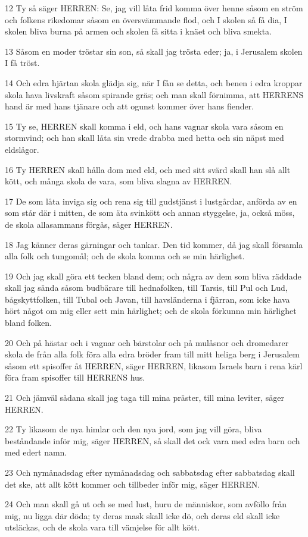 \par 12 Ty så säger HERREN: Se, jag vill låta frid komma över henne såsom en ström och folkens rikedomar såsom en översvämmande flod, och I skolen så få dia, I skolen bliva burna på armen och skolen få sitta i knäet och bliva smekta.
\par 13 Såsom en moder tröstar sin son, så skall jag trösta eder; ja, i Jerusalem skolen I få tröst.
\par 14 Och edra hjärtan skola glädja sig, när I fån se detta, och benen i edra kroppar skola hava livskraft såsom spirande gräs; och man skall förnimma, att HERRENS hand är med hans tjänare och att ogunst kommer över hans fiender.
\par 15 Ty se, HERREN skall komma i eld, och hans vagnar skola vara såsom en stormvind; och han skall låta sin vrede drabba med hetta och sin näpst med eldslågor.
\par 16 Ty HERREN skall hålla dom med eld, och med sitt svärd skall han slå allt kött, och många skola de vara, som bliva slagna av HERREN.
\par 17 De som låta inviga sig och rena sig till gudstjänst i lustgårdar, anförda av en som står där i mitten, de som äta svinkött och annan styggelse, ja, också möss, de skola allasammans förgås, säger HERREN.
\par 18 Jag känner deras gärningar och tankar. Den tid kommer, då jag skall församla alla folk och tungomål; och de skola komma och se min härlighet.
\par 19 Och jag skall göra ett tecken bland dem; och några av dem som bliva räddade skall jag sända såsom budbärare till hednafolken, till Tarsis, till Pul och Lud, bågskyttfolken, till Tubal och Javan, till havsländerna i fjärran, som icke hava hört något om mig eller sett min härlighet; och de skola förkunna min härlighet bland folken.
\par 20 Och på hästar och i vagnar och bärstolar och på mulåsnor och dromedarer skola de från alla folk föra alla edra bröder fram till mitt heliga berg i Jerusalem såsom ett spisoffer åt HERREN, säger HERREN, likasom Israels barn i rena kärl föra fram spisoffer till HERRENS hus.
\par 21 Och jämväl sådana skall jag taga till mina präster, till mina leviter, säger HERREN.
\par 22 Ty likasom de nya himlar och den nya jord, som jag vill göra, bliva beståndande inför mig, säger HERREN, så skall det ock vara med edra barn och med edert namn.
\par 23 Och nymånadsdag efter nymånadsdag och sabbatsdag efter sabbatsdag skall det ske, att allt kött kommer och tillbeder inför mig, säger HERREN.
\par 24 Och man skall gå ut och se med lust, huru de människor, som avföllo från mig, nu ligga där döda; ty deras mask skall icke dö, och deras eld skall icke utsläckas, och de skola vara till vämjelse för allt kött.


